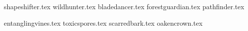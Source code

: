 \raggedcolumns
\begin{multicols}{2}


	\kindredsintro{}
	
	\startsortedpricelist
	
	{shapeshifter.tex}
	{wildhunter.tex}
	{bladedancer.tex}
	{forestguardian.tex}
	{pathfinder.tex}

	\endsortedpricelist

	\columnbreak


	\aspectsofnatureintro{}

	\startsortedpricelist
	
	{entanglingvines.tex}
	{toxicspores.tex}
	{scarredbark.tex}
	{oakencrown.tex}

	\endsortedpricelist

\end{multicols}

